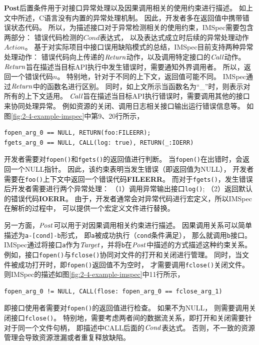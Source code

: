 \textbf{Post}后置条件用于对接口异常处理以及因果调用相关的使用约束进行描述。
如上文中所述，C语言没有内置的异常处理机制。
因此，开发者多在返回值中携带错误状态代码。
所以，为描述接口对于异常检测相关的使用约束，IMSpec需要包含两部分：
错误代码检测的$\mathit{Cond}$表达式，
以及表达式成立时后续的异常处理动作$\mathit{Action}$。
基于对实际项目中接口误用缺陷模式的总结，IMSpec目前支持两种异常处理动作：
错误代码向上传递的$\mathit{Return}$动作，以及调用特定接口的$\mathit{Call}$动作。
$\mathit{Return}$旨在描述当目标API执行中发生错误时，需要通知外界调用者。
所以，返回一个错误代码$n$。
特别地，针对于不同的上下文，返回值可能不同。
IMSpec通过$\mathit{Return}$中的函数名进行区别。
同时，如上文所示当函数名为“\_”时，则表示对所有的上下文适用。
$\mathit{Call}$旨在描述当目标API执行错误时，需要调用其他的接口来协同处理异常。
例如资源的关闭、调用日志相关接口输出运行错误信息等。
如图\ref{fig:2-4-example-imspec}中第9、20行所示，
\begin{lstlisting}[language={[ANSI]C},
basicstyle=\linespread{0.8}\listingsfont,
numbers=none,
xleftmargin=.15\textwidth]
fopen_arg_0 == NULL, RETURN(foo:FILEERR);
fgets_arg_0 == NULL, CALL(log: true), RETURN(_:IOERR)
\end{lstlisting}
开发者需要对\texttt{fopen()}和\texttt{fgets()}的返回值进行判断。
当\texttt{fopen()}在出错时，会返回一个NULL指针。
因此，该约束表明当发生错误（即返回值为NULL），
开发者需要在\texttt{foo()}上下文中返回一个错误代码\textbf{FILEERR}。
而对于\texttt{fgets()}，发生错误后开发者需要进行两个异常处理：
（1）调用异常输出接口\texttt{log()};
（2）返回默认的错误代码\textbf{IOERR}。
由于，开发者通常会对异常代码进行宏定义，所以IMSpec在解析的过程中，
可以提供一个宏定义文件进行替换。

另一方面，$\mathit{Post}$可以用于对因果调用相关约束进行描述。
因果调用关系可以简单描述为\texttt{a-[cond]-b}形式，
即\texttt{a}被成功执行（\texttt{cond}条件满足），
那么就调用\texttt{b}接口。
IMSpec通过将接口\texttt{a}作为$\mathit{Target}$，并将\texttt{b}在$\mathit{Post}$中描述的方式描述这种约束关系。
例如，接口\texttt{fopen()}与\texttt{fclose()}协同对文件的打开和关闭进行管理。
同时，当文件被成功打开时，即\texttt{fopen()}返回值不为空时，
才需要调用\texttt{fclose()}关闭文件。
则IMSpec的描述如图\ref{fig:2-4-example-imspec}中11行所示，
\begin{lstlisting}[language={[ANSI]C},
basicstyle=\linespread{0.8}\listingsfont,
numbers=none,
xleftmargin=.15\textwidth]
fopen_arg_0 != NULL, CALL(flose: fopen_arg_0 == fclose_arg_1)
\end{lstlisting}
即接口使用者需要对\texttt{fopen()}的返回值进行检查。
如果不为NULL，
则需要调用关闭接口\texttt{fclose()}。
特别地，需要考虑两者间的数据流关系，即打开和关闭需要针对于同一个文件句柄，
即描述中CALL后面的$\mathit{Cond}$表达式。
否则，不一致的资源管理会导致资源泄漏或者重复释放缺陷。


